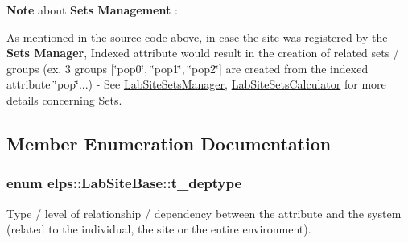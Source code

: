 {\bfseries Note } about {\bfseries Sets Management} \+:

As mentioned in the source code above, in case the site was registered by the {\bfseries Sets Manager}, Indexed attribute would result in the creation of related sets / groups (ex. 3 groups \mbox{[}\char`\"{}pop0\char`\"{}, \char`\"{}pop1\char`\"{}, \char`\"{}pop2\char`\"{}\mbox{]} are created from the indexed attribute \char`\"{}pop\char`\"{}...) -\/ See \hyperlink{classelps_1_1_lab_site_sets_manager}{Lab\+Site\+Sets\+Manager}, \hyperlink{classelps_1_1_lab_site_sets_calculator}{Lab\+Site\+Sets\+Calculator} for more details concerning Sets. 

\subsection{Member Enumeration Documentation}
\hypertarget{classelps_1_1_lab_site_base_a8ec08fafa015dfa53827d985608afe58}{
\subsubsection[{t\+\_\+deptype}]{\setlength{\rightskip}{0pt plus 5cm}enum {\bf elps\+::\+Lab\+Site\+Base\+::t\+\_\+deptype}}}\label{classelps_1_1_lab_site_base_a8ec08fafa015dfa53827d985608afe58}
Type / level of relationship / dependency between the attribute and the system (related to the individual, the site or the entire environment). 

